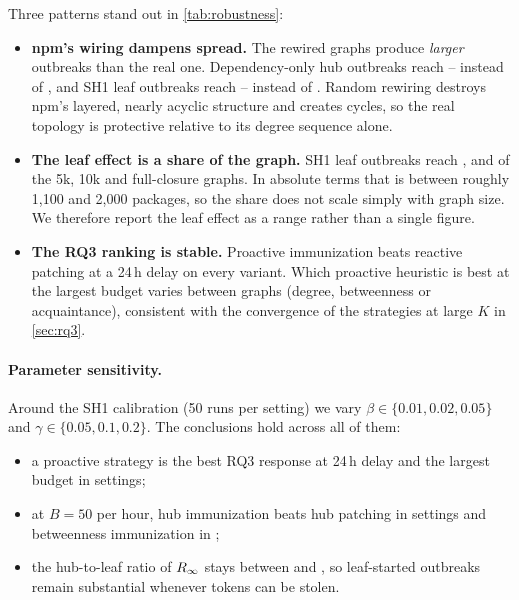 Three patterns stand out in \cref{tab:robustness}:
\begin{itemize}
  \item \textbf{npm's wiring dampens spread.} The \NullCount{} rewired graphs produce \emph{larger}
        outbreaks than the real one. Dependency-only hub outbreaks reach
        \NullDepHubMin--\NullDepHubMax{} instead of \RQOneDepOnlyHub, and SH1 leaf outbreaks reach
        \NullLeafMin--\NullLeafMax{} instead of \RQOneShOneLeaf. Random rewiring destroys npm's layered,
        nearly acyclic structure and creates cycles, so the real topology is protective relative to its
        degree sequence alone.
  \item \textbf{The leaf effect is a share of the graph.} SH1 leaf outbreaks reach \SizeFiveLeafShOne{},
        \SizeMainLeafShOne{} and \SizeFullLeafShOne{} of the 5k, 10k and full-closure graphs. In absolute terms that is between roughly 1{,}100 and 2{,}000 packages, so the
        share does not scale simply with graph size. We therefore report the leaf effect as a range
        rather than a single figure.
  \item \textbf{The RQ3 ranking is stable.} Proactive immunization beats reactive patching at a 24\,h
        delay on every variant. Which proactive heuristic is best at the largest budget varies between
        graphs (degree, betweenness or acquaintance), consistent with the convergence of the strategies
        at large $K$ in \cref{sec:rq3}.
\end{itemize}

\paragraph{Parameter sensitivity.}
Around the SH1 calibration (50 runs per setting) we vary $\beta\in\{0.01,\allowbreak 0.02,\allowbreak 0.05\}$ and
$\gamma\in\{0.05,\allowbreak 0.1,\allowbreak 0.2\}$. The
conclusions hold across all of them:
\begin{itemize}
  \item a proactive strategy is the best RQ3 response at 24\,h delay and the largest budget in
        \SensProactiveBest{} settings;
  \item at $B=50$ per hour, hub immunization beats hub patching in \SensImmBeatsPatch{} settings and
        betweenness immunization in \SensDegreeBeatsFirebreak;
  \item the hub-to-leaf ratio of $R_\infty$ stays between \SensHubLeafMin{} and \SensHubLeafMax, so
        leaf-started outbreaks remain substantial whenever tokens can be stolen.
\end{itemize}
